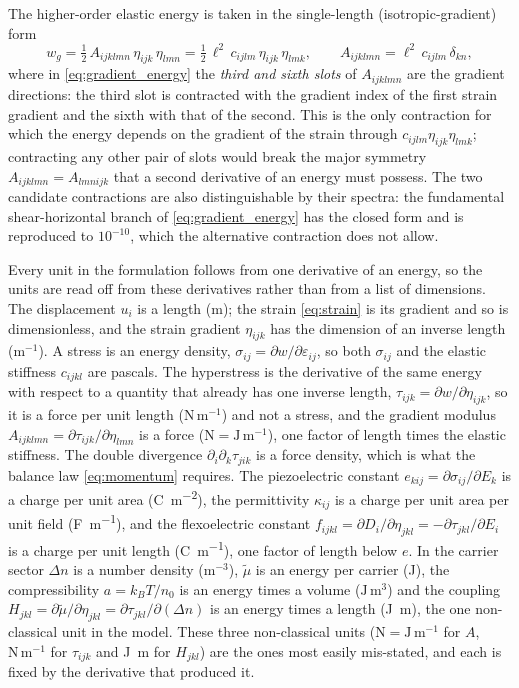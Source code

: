 The higher-order elastic energy is taken in the single-length
(isotropic-gradient) form
\begin{equation}
\label{eq:gradient_energy}
w_g=\tfrac12\,A_{ijklmn}\,\eta_{ijk}\,\eta_{lmn}
=\tfrac12\,\ell^{2}\,c_{ijlm}\,\eta_{ijk}\,\eta_{lmk},
\qquad
A_{ijklmn}=\ell^{2}\,c_{ijlm}\,\delta_{kn},
\end{equation}
where in \eqref{eq:gradient_energy} the \emph{third and sixth slots} of
$A_{ijklmn}$ are the gradient directions: the third slot is contracted with the
gradient index of the first strain gradient and the sixth with that of the
second.  This is the only contraction for which the energy depends on the
gradient of the strain through $c_{ijlm}\eta_{ijk}\eta_{lmk}$; contracting any
other pair of slots would break the major symmetry
$A_{ijklmn}=A_{lmnijk}$ that a second derivative of an energy must possess.  The two candidate contractions are also distinguishable by their spectra: the
fundamental shear-horizontal branch of \eqref{eq:gradient_energy} has the closed
form and is reproduced to
$10^{-10}$, which the alternative contraction does not allow.

Every unit in the formulation follows from one derivative of an energy, so the units are read off from these derivatives rather than from a list of dimensions.
The displacement $u_i$ is a length (m); the strain \eqref{eq:strain} is its
gradient and so is dimensionless, and the strain gradient $\eta_{ijk}$
has the dimension of an inverse length (m$^{-1}$).  A stress is an energy density,
$\sigma_{ij}=\partial w/\partial\varepsilon_{ij}$, so both $\sigma_{ij}$ and the
elastic stiffness $c_{ijkl}$ are pascals.  The hyperstress is the derivative of
the same energy with respect to a quantity that already has one inverse
length, $\tau_{ijk}=\partial w/\partial\eta_{ijk}$, so it is a force per unit
length ($\mathrm{N\,m^{-1}}$) and not a stress, and the gradient modulus
$A_{ijklmn}=\partial\tau_{ijk}/\partial\eta_{lmn}$ is a force
($\mathrm{N}=\mathrm{J\,m^{-1}}$), one factor of length times the elastic stiffness.  The double
divergence $\partial_i\partial_k\tau_{jik}$ is a force density, which is what
the balance law \eqref{eq:momentum} requires.  The piezoelectric constant
$e_{kij}=\partial\sigma_{ij}/\partial E_k$ is a charge per unit area
(\si{\coulomb\per\square\metre}), the permittivity $\kappa_{ij}$ is a charge
per unit area per unit field (\si{\farad\per\metre}), and the flexoelectric
constant $f_{ijkl}=\partial D_i/\partial\eta_{jkl}=-\partial\tau_{jkl}/\partial
E_i$ is a charge per unit length (\si{\coulomb\per\metre}), one factor of
length below $e$.  In the carrier sector $\Delta n$ is a number density
(m$^{-3}$), $\widetilde\mu$ is an energy per carrier (J), the compressibility
$a=k_BT/n_0$ is an energy times a volume ($\mathrm{J\,m^{3}}$) and the
coupling $H_{jkl}=\partial\widetilde\mu/\partial\eta_{jkl}=\partial\tau_{jkl}/
\partial(\Delta n)$ is an energy times a length (\si{\joule\metre}), the one
non-classical unit in the model.  These three non-classical units ($\mathrm{N}=\mathrm{J\,m^{-1}}$ for $A$, $\mathrm{N\,m^{-1}}$ for $\tau_{ijk}$ and
\si{\joule\metre} for $H_{jkl}$) are the ones most easily mis-stated, and
each is fixed by the derivative that produced it.


